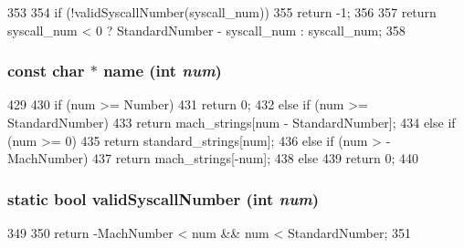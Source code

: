 \begin{DoxyCode}
353                                         {
354         if (!validSyscallNumber(syscall_num))
355             return -1;
356 
357         return syscall_num < 0 ? StandardNumber - syscall_num : syscall_num;
358     }
\end{DoxyCode}
\hypertarget{classSystemCalls_3_01Tru64_01_4_a37ba7db7a75b51cfe17dcc3d2e3bd315}{
\subsubsection[{name}]{\setlength{\rightskip}{0pt plus 5cm}const char $\ast$ name (int {\em num})}}
\label{classSystemCalls_3_01Tru64_01_4_a37ba7db7a75b51cfe17dcc3d2e3bd315}



\begin{DoxyCode}
429 {
430     if (num >= Number)
431         return 0;
432     else if (num >= StandardNumber)
433         return mach_strings[num - StandardNumber];
434     else if (num >= 0)
435         return standard_strings[num];
436     else if (num > -MachNumber)
437         return mach_strings[-num];
438     else
439         return 0;
440 }
\end{DoxyCode}
\hypertarget{classSystemCalls_3_01Tru64_01_4_a16b77c15073fe4a4996b823f6e7a7096}{
\subsubsection[{validSyscallNumber}]{\setlength{\rightskip}{0pt plus 5cm}static bool validSyscallNumber (int {\em num})}}
\label{classSystemCalls_3_01Tru64_01_4_a16b77c15073fe4a4996b823f6e7a7096}



\begin{DoxyCode}
349                                             {
350         return -MachNumber < num && num < StandardNumber;
351     }
\end{DoxyCode}



